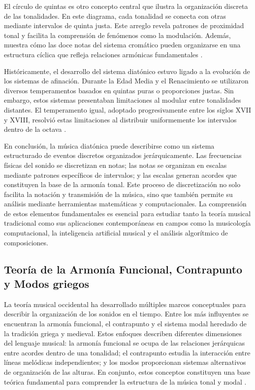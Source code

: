 \documentclass[12pt]{report}
\begin{document}
El círculo de quintas es otro concepto central que ilustra la organización discreta de las tonalidades. En este diagrama, cada tonalidad se conecta con otras mediante intervalos de quinta justa. Este arreglo revela patrones de proximidad tonal y facilita la comprensión de fenómenos como la modulación. Además, muestra cómo las doce notas del sistema cromático pueden organizarse en una estructura cíclica que refleja relaciones armónicas fundamentales \cite{krumhansl1990cognitive}.

Históricamente, el desarrollo del sistema diatónico estuvo ligado a la evolución de los sistemas de afinación. Durante la Edad Media y el Renacimiento se utilizaron diversos temperamentos basados en quintas puras o proporciones justas. Sin embargo, estos sistemas presentaban limitaciones al modular entre tonalidades distantes. El temperamento igual, adoptado progresivamente entre los siglos XVII y XVIII, resolvió estas limitaciones al distribuir uniformemente los intervalos dentro de la octava \cite{duffin2007how}.

En conclusión, la música diatónica puede describirse como un sistema estructurado de eventos discretos organizados jerárquicamente. Las frecuencias físicas del sonido se discretizan en notas; las notas se organizan en escalas mediante patrones específicos de intervalos; y las escalas generan acordes que constituyen la base de la armonía tonal. Este proceso de discretización no solo facilita la notación y transmisión de la música, sino que también permite su análisis mediante herramientas matemáticas y computacionales. La comprensión de estos elementos fundamentales es esencial para estudiar tanto la teoría musical tradicional como sus aplicaciones contemporáneas en campos como la musicología computacional, la inteligencia artificial musical y el análisis algorítmico de composiciones.


\subsection{Teoría de la Armonía Funcional, Contrapunto y Modos griegos}

La teoría musical occidental ha desarrollado múltiples marcos conceptuales para describir la organización de los sonidos en el tiempo. Entre los más influyentes se encuentran la armonía funcional, el contrapunto y el sistema modal heredado de la tradición griega y medieval. Estos enfoques describen diferentes dimensiones del lenguaje musical: la armonía funcional se ocupa de las relaciones jerárquicas entre acordes dentro de una tonalidad; el contrapunto estudia la interacción entre líneas melódicas independientes; y los modos proporcionan sistemas alternativos de organización de las alturas. En conjunto, estos conceptos constituyen una base teórica fundamental para comprender la estructura de la música tonal y modal \cite{delamotte1991harmony}.
\end{document}
